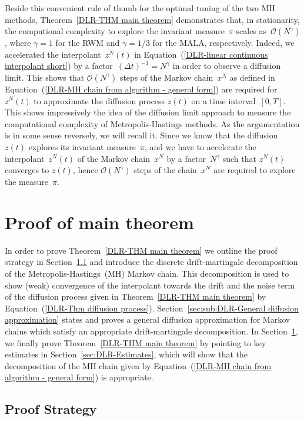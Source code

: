Beside this convenient rule of thumb for the optimal tuning of the two MH methods, Theorem~\ref{DLR-THM main theorem} demonstrates that, in stationarity, the computional complexity to explore the invariant measure~$\pi$ scales as~$\mathcal{O}(N^{\gamma})$, where $\gamma=1$ for the RWM and $\gamma=1/3$ for the MALA, respectively. Indeed, we accelerated the interpolant~$z^N(t)$ in Equation~(\ref{DLR-linear continuous interpolant short}) by a factor~$(\Delta t)^{-1} = N^{\gamma}$ in order to observe a diffusion limit. This shows that $\mathcal{O}(N^{\gamma})$ steps of the Markov chain~$x^N$ as defined in Equation~(\ref{DLR-MH chain from algorithm - general form}) are required for $z^N(t)$ to approximate the diffusion process $z(t)$ on a time interval~$[0,T]$. This shows impressively the idea of the diffusion limit approach to measure the computational complexity of Metropolis-Hastings methods. As the argumentation is in some sense reversely, we will recall it. Since we know that the diffusion~$z(t)$ explores its invariant measure~$\pi$, and we have to accelerate the interpolant~$z^N(t)$ of the Markov chain~$x^N$ by a factor~$N^{\gamma}$ such that $z^N(t)$ converges to $z(t)$, hence $\mathcal{O}(N^{\gamma})$ steps of the chain~$x^N$ are required to explore the measure~$\pi$.


\section{Proof of main theorem}
\label{sec:DLR-Proof}

In order to prove Theorem~\ref{DLR-THM main theorem} we outline the proof strategy in Section~\ref{sec:sub:DLR-Proof strategy} and introduce the discrete drift-martingale decomposition of the Metropolis-Hastings~(MH) Markov chain. This decomposition is used to show (weak) convergence of the interpolant towards the drift and the noise term of the diffusion process given in Theorem~\ref{DLR-THM main theorem} by Equation~(\ref{DLR-Thm diffusion process}). Section~\ref{sec:sub:DLR-General diffusion approximation} states and proves a general diffusion approximation for Markov chains which satisfy an appropriate drift-martingale decomposition. In Section~\ref{sec:DLR-Proof}, we finally prove Theorem~\ref{DLR-THM main theorem} by pointing to key estimates in Section~\ref{sec:DLR-Estimates}, which will show that the decomposition of the MH chain given by Equation~(\ref{DLR-MH chain from algorithm - general form}) is appropriate.

\subsection{Proof Strategy}
\label{sec:sub:DLR-Proof strategy}


